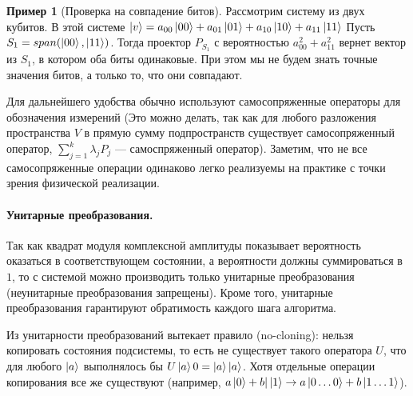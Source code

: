 \documentclass{article}
\theoremstyle{definition}
\newtheorem{example}{Пример}
\begin{document}
\begin{example}[Проверка на совпадение битов]
    Рассмотрим систему из двух кубитов.
    В этой системе $\ket{v} = a_{00}\ket{00} + a_{01}\ket{01} + a_{10}\ket{10} + a_{11}\ket{11}$
    Пусть $S_1 = span(\ket{00}, \ket{11})$.
    Тогда проектор $P_{S_1}$ с вероятностью $a_{00}^2 + a_{11}^2$ вернет вектор из $S_1$,
    в котором оба биты одинаковые.
    При этом мы не будем знать точные значения битов, а только то, что они совпадают.
\end{example}

Для дальнейшего удобства обычно используют самосопряженные операторы для обозначения измерений
(Это можно делать, так как для любого разложения пространства $V$ в прямую сумму подпространств существует
самосопряженный оператор, $\sum_{j=1}^k \lambda_j P_j$ --- самоспряженный оператор).
Заметим, что не все самосопряженные операции одинаково легко реализуемы на практике с точки зрения физической реализации.


\paragraph*{Унитарные преобразования.}
Так как квадрат модуля комплексной амплитуды показывает вероятность оказаться в соответствующем состоянии,
а вероятности должны суммироваться в $1$,
то с системой можно производить только унитарные преобразования
(неунитарные преобразования запрещены).
Кроме того, унитарные преобразования гарантируют обратимость каждого шага алгоритма.

Из унитарности преобразований вытекает правило (no-cloning): нельзя копировать состояния подсистемы,
то есть не существует такого оператора $U$, что для любого $\ket{a}$ выполнялось бы $U\ket{a}{0} = \ket{a}\ket{a}$.
Хотя отдельные операции копирования все же существуют
(например, $a\ket{0} + b|\ket{1} \rightarrow a\ket{0\ldots0} + b\ket{1\ldots1}$).
\end{document}
